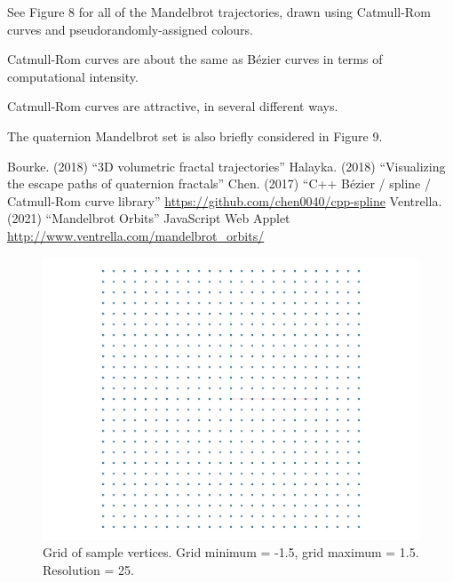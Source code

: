 \documentclass[12pt]{article}
\begin{document}
See Figure 8 for all of the Mandelbrot trajectories, drawn using Catmull-Rom curves and pseudorandomly-assigned colours.

Catmull-Rom curves are about the same as B\'ezier curves in terms of computational intensity.

Catmull-Rom curves are attractive, in several different ways.

The quaternion Mandelbrot set is also briefly considered in Figure 9.






\begin{thebibliography}{9}
 Bourke. (2018) ``3D volumetric fractal trajectories''
 Halayka. (2018) ``Visualizing the escape paths of quaternion fractals''
 Chen. (2017) ``C++ B\'ezier / spline / Catmull-Rom curve library'' \linebreak \url{https://github.com/chen0040/cpp-spline}
 Ventrella. (2021) ``Mandelbrot Orbits'' JavaScript Web Applet \linebreak \url{http://www.ventrella.com/mandelbrot_orbits/}



\end{thebibliography}



\pagebreak

\begin{figure} 
\centering
  \includegraphics[width = 5 in]{grid.png}	
  \caption{Grid of sample vertices.
Grid minimum = -1.5, grid maximum = 1.5.
Resolution = 25.
}
\end{figure}
\end{document}
